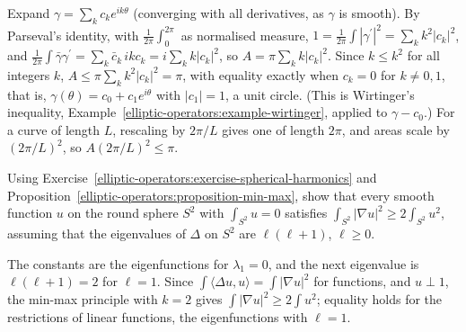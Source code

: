 \begin{solution}
Expand $\gamma = \sum_kc_ke^{ik\theta}$ (converging with all derivatives, as $\gamma$ is smooth). By Parseval's identity, with $\frac{1}{2\pi}\int_0^{2\pi}$ as normalised measure, $1 = \frac{1}{2\pi}\int|\gamma^{\prime}|^2 = \sum_kk^2|c_k|^2$, and
$\frac{1}{2\pi}\int\bar\gamma\gamma^{\prime} = \sum_k\bar c_k\,ikc_k = i\sum_kk|c_k|^2$, so $A = \pi\sum_kk|c_k|^2$. Since $k \leq k^2$ for all integers $k$, $A \leq \pi\sum_kk^2|c_k|^2 = \pi$, with equality exactly when
$c_k = 0$ for $k \neq 0, 1$, that is, $\gamma(\theta) = c_0 + c_1e^{i\theta}$ with $|c_1| = 1$, a unit circle. (This is Wirtinger's inequality, Example~\ref{elliptic-operators:example-wirtinger}, applied to
$\gamma - c_0$.) For a curve of length $L$, rescaling by $2\pi/L$ gives one of length $2\pi$, and areas scale by $(2\pi/L)^2$, so $A(2\pi/L)^2 \leq \pi$.
\end{solution}

\begin{exercise}\label{elliptic-operators:exercise-first-eigenvalue-sphere}
Using Exercise~\ref{elliptic-operators:exercise-spherical-harmonics} and Proposition~\ref{elliptic-operators:proposition-min-max}, show that every smooth function $u$ on the round sphere $S^2$ with
$\int_{S^2}u = 0$ satisfies $\int_{S^2}|\nabla u|^2 \geq 2\int_{S^2}u^2$, assuming that the eigenvalues of $\Delta$ on $S^2$ are $\ell(\ell + 1)$, $\ell \geq 0$.
\end{exercise}

\begin{solution}
The constants are the eigenfunctions for $\lambda_1 = 0$, and the next eigenvalue is $\ell(\ell + 1) = 2$ for $\ell = 1$. Since $\int\langle\Delta u, u\rangle = \int|\nabla u|^2$ for functions, and $u \perp 1$, the min-max
principle with $k = 2$ gives $\int|\nabla u|^2 \geq 2\int u^2$; equality holds for the restrictions of linear functions, the eigenfunctions with $\ell = 1$.
\end{solution}

